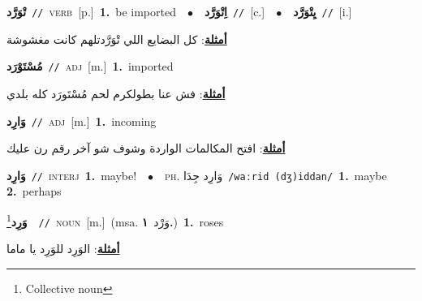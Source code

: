 \documentclass[10pt,a4paper,twoside]{article} %
\begin{document}
\begin{multicols}{2}
{\setlength\topsep{0pt}\textbf{\foreignlanguage{arabic}{تْوَرَّد}}\ {\color{gray}\texttt{//}\color{black}}\ \textsc{verb}\ [p.]\ \textbf{1.}~be imported\ \ $\bullet$\ \ \setlength\topsep{0pt}\textbf{\foreignlanguage{arabic}{اِتْوَرَّد}}\ {\color{gray}\texttt{//}\color{black}}\ [c.]\ \ $\bullet$\ \ \setlength\topsep{0pt}\textbf{\foreignlanguage{arabic}{يِتْوَرَّد}}\ {\color{gray}\texttt{//}\color{black}}\ [i.]\  \begin{flushright}\color{gray}\foreignlanguage{arabic}{\textbf{\underline{\foreignlanguage{arabic}{أمثلة}}}: كل البضايع اللي تْوَرَّدتلهم كانت مغشوشة}\end{flushright}\color{black}} \vspace{2mm}

{\setlength\topsep{0pt}\textbf{\foreignlanguage{arabic}{مُسْتَوْرَد}}\ {\color{gray}\texttt{//}\color{black}}\ \textsc{adj}\ [m.]\ \textbf{1.}~imported\  \begin{flushright}\color{gray}\foreignlanguage{arabic}{\textbf{\underline{\foreignlanguage{arabic}{أمثلة}}}: فش عنا بطولكرم لحم مُسْتَورَد كله بلدي}\end{flushright}\color{black}} \vspace{2mm}

{\setlength\topsep{0pt}\textbf{\foreignlanguage{arabic}{وَارِد}}\ {\color{gray}\texttt{//}\color{black}}\ \textsc{adj}\ [m.]\ \textbf{1.}~incoming\  \begin{flushright}\color{gray}\foreignlanguage{arabic}{\textbf{\underline{\foreignlanguage{arabic}{أمثلة}}}: افتح المكالمات الواردة وشوف شو آخر رقم رن عليك}\end{flushright}\color{black}} \vspace{2mm}

{\setlength\topsep{0pt}\textbf{\foreignlanguage{arabic}{وَارِد}}\ {\color{gray}\texttt{//}\color{black}}\ \textsc{interj}\ \textbf{1.}~maybe!\ \ $\bullet$\ \ \textsc{ph.} \color{gray} \foreignlanguage{arabic}{وَارِد جِدَا}\color{black}\ {\color{gray}\texttt{/{\sffamily waːrid (dʒ)iddan}/}\color{black}}\ \textbf{1.}~maybe  \textbf{2.}~perhaps\ } \vspace{2mm}

{\setlength\topsep{0pt}\textbf{\foreignlanguage{arabic}{وَرِد}}\footnote{Collective noun}\ \ {\color{gray}\texttt{//}\color{black}}\ \textsc{noun}\ [m.]\ \color{gray}(msa. \foreignlanguage{arabic}{وَرْد}~\foreignlanguage{arabic}{\textbf{١.}})\color{black}\ \textbf{1.}~roses\  \begin{flushright}\color{gray}\foreignlanguage{arabic}{\textbf{\underline{\foreignlanguage{arabic}{أمثلة}}}: الوَرِد للوَرِد يا ماما}\end{flushright}\color{black}} \vspace{2mm}


\end{multicols}
\end{document}
